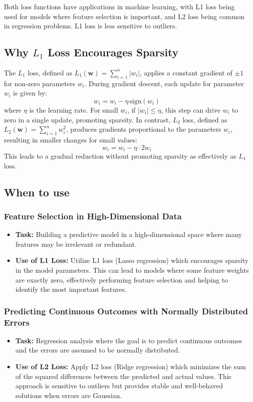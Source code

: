 \documentclass[12pt]{article}
\begin{document}
Both loss functions have applications in machine learning, with L1 loss being used for models where feature selection is important, and L2 loss being common in regression problems. L1 loss is less sensitive to outliers. 
\subsection{Why \( L_1 \) Loss Encourages Sparsity}
The \( L_1 \) loss, defined as \( L_1(\mathbf{w}) = \sum_{i=1}^n |w_i| \), applies a constant gradient of \( \pm 1 \) for non-zero parameters \( w_i \). During gradient descent, each update for parameter \( w_i \) is given by:
\[
w_i = w_i - \eta \, \text{sign}(w_i)
\]
where \( \eta \) is the learning rate. For small \( w_i \), if \( |w_i| \leq \eta \), this step can drive \( w_i \) to zero in a single update, promoting sparsity. In contrast, \( L_2 \) loss, defined as \( L_2(\mathbf{w}) = \sum_{i=1}^n w_i^2 \), produces gradients proportional to the parameters \( w_i \), resulting in smaller changes for small values:
\[
w_i = w_i - \eta \cdot 2 w_i
\]
This leads to a gradual reduction without promoting sparsity as effectively as \( L_1 \) loss.

\subsection{When to use}
\subsubsection{Feature Selection in High-Dimensional Data}
\begin{itemize}
    \item \textbf{Task:} Building a predictive model in a high-dimensional space where many features may be irrelevant or redundant.
    \item \textbf{Use of L1 Loss:} Utilize L1 loss (Lasso regression) which encourages sparsity in the model parameters. This can lead to models where some feature weights are exactly zero, effectively performing feature selection and helping to identify the most important features.
\end{itemize}
\subsubsection{Predicting Continuous Outcomes with Normally Distributed Errors}
\begin{itemize}
    \item \textbf{Task:} Regression analysis where the goal is to predict continuous outcomes and the errors are assumed to be normally distributed.
    \item \textbf{Use of L2 Loss:} Apply L2 loss (Ridge regression) which minimizes the sum of the squared differences between the predicted and actual values. This approach is sensitive to outliers but provides stable and well-behaved solutions when errors are Gaussian.
\end{itemize}
\end{document}
